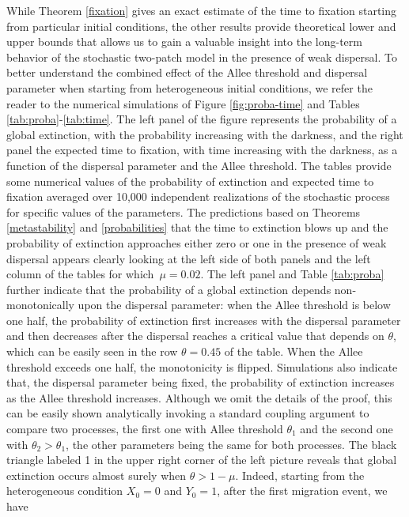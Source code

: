 \indent While Theorem \ref{fixation} gives an exact estimate of the time to fixation starting from particular initial conditions,
 the other results provide theoretical lower and upper bounds that allows us to gain a valuable insight into the long-term behavior
 of the stochastic two-patch model in the presence of weak dispersal.
 To better understand the combined effect of the Allee threshold and dispersal parameter when starting from heterogeneous initial
 conditions, we refer the reader to the numerical simulations of Figure \ref{fig:proba-time} and Tables \ref{tab:proba}-\ref{tab:time}.
 The left panel of the figure represents the probability of a global extinction, with the probability increasing with the darkness,
 and the right panel the expected time to fixation, with time increasing with the darkness, as a function of the dispersal parameter
 and the Allee threshold.
 The tables provide some numerical values of the probability of extinction and expected time to fixation averaged over 10,000
 independent realizations of the stochastic process for specific values of the parameters.
 The predictions based on Theorems \ref{metastability} and \ref{probabilities} that the time to extinction blows up and the
 probability of extinction approaches either zero or one in the presence of weak dispersal appears clearly looking at the left side
 of both panels and the left column of the tables for which~$\mu = 0.02$.
 The left panel and Table \ref{tab:proba} further indicate that the probability of a global extinction depends non-monotonically
 upon the dispersal parameter:
 when the Allee threshold is below one half, the probability of extinction first increases with the dispersal parameter
 and then decreases after the dispersal reaches a critical value that depends on $\theta$, which can be easily seen in the
 row $\theta = 0.45$ of the table.
 When the Allee threshold exceeds one half, the monotonicity is flipped.
 Simulations also indicate that, the dispersal parameter being fixed, the probability of extinction increases as the Allee
 threshold increases.
 Although we omit the details of the proof, this can be easily shown analytically invoking a standard coupling argument to compare
 two processes, the first one with Allee threshold $\theta_1$ and the second one with $\theta_2 > \theta_1$, the other parameters
 being the same for both processes.
 The black triangle labeled 1 in the upper right corner of the left picture reveals that global extinction occurs almost surely
 when $\theta > 1 - \mu$.
 Indeed, starting from the heterogeneous condition $X_0 = 0$ and $Y_0 = 1$, after the first migration event, we have
